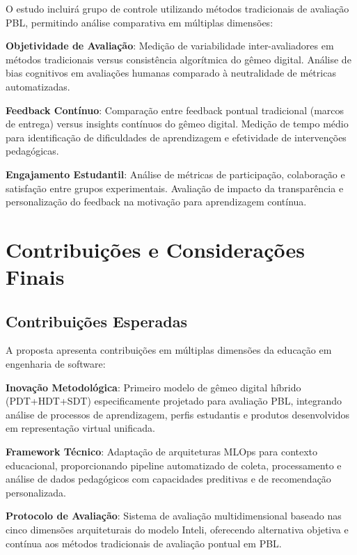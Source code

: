 \documentclass[english, spanish, brazilian]{RBIEarticle} %
\begin{document}
\indent

O estudo incluirá grupo de controle utilizando métodos tradicionais de
avaliação PBL, permitindo análise comparativa em múltiplas dimensões:

\textbf{Objetividade de Avaliação}: Medição de variabilidade inter-avaliadores em métodos tradicionais versus consistência algorítmica do gêmeo digital. Análise de bias cognitivos em avaliações humanas comparado à neutralidade de métricas automatizadas.

\textbf{Feedback Contínuo}: Comparação entre feedback pontual tradicional (marcos de entrega) versus insights contínuos do gêmeo digital. Medição de tempo médio para identificação de dificuldades de aprendizagem e efetividade de intervenções pedagógicas.

\textbf{Engajamento Estudantil}: Análise de métricas de participação, colaboração e satisfação entre grupos experimentais. Avaliação de impacto da transparência e personalização do feedback na motivação para aprendizagem contínua.

\section{Contribuições e Considerações Finais}

\subsection{Contribuições Esperadas}

\indent

A proposta apresenta contribuições em múltiplas dimensões da educação em
engenharia de software:

\textbf{Inovação Metodológica}: Primeiro modelo de gêmeo digital híbrido (PDT+HDT+SDT) especificamente projetado para avaliação PBL, integrando análise de processos de aprendizagem, perfis estudantis e produtos desenvolvidos em representação virtual unificada.

\textbf{Framework Técnico}: Adaptação de arquiteturas MLOps para contexto educacional, proporcionando pipeline automatizado de coleta, processamento e análise de dados pedagógicos com capacidades preditivas e de recomendação personalizada.

\textbf{Protocolo de Avaliação}: Sistema de avaliação multidimensional baseado nas cinco dimensões arquiteturais do modelo Inteli, oferecendo alternativa objetiva e contínua aos métodos tradicionais de avaliação pontual em PBL.
\end{document}
